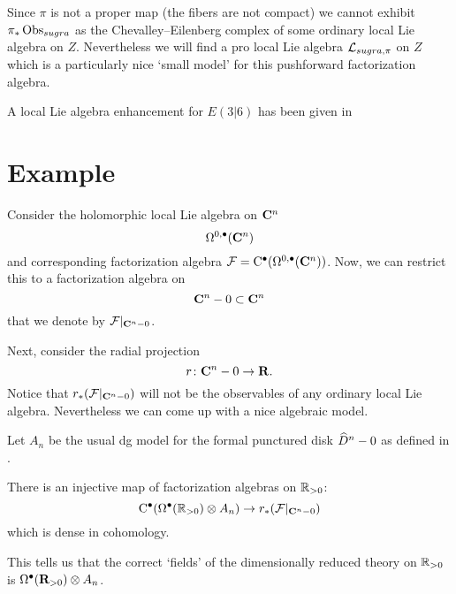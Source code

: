 \documentclass[11pt]{amsart}
\begin{document}
Since $\pi$ is not a proper map (the fibers are not compact) we cannot exhibit $\pi_*\Obs_{sugra}$ as the Chevalley--Eilenberg complex of some ordinary local Lie algebra on $Z$. 
Nevertheless we will find a pro local Lie algebra $\cL_{sugra,\pi}$ on $Z$ which is a particularly nice `small model' for this pushforward factorization algebra.

A local Lie algebra enhancement for $E(3|6)$ has been given in \cite{SWsuca6d} 







\section{Example} 

Consider the holomorphic local Lie algebra on $\C^n$
\[
\Omega^{0,\bu}(\C^n) 
\]
and corresponding factorization algebra $\cF = \clie^\bu(\Omega^{0,\bu}(\C^n))$. 
Now, we can restrict this to a factorization algebra on
\[
\C^n - 0 \subset \C^n
\]
that we denote by $\cF|_{\C^n - 0}$. 

Next, consider the radial projection
\[
r \colon \C^n - 0 \to \R .
\]
Notice that $r_* (\cF|_{\C^n - 0})$ will not be the observables of any ordinary local Lie algebra.
Nevertheless we can come up with a nice algebraic model.  

Let $A_n$ be the usual dg model for the formal punctured disk $\Hat{D}^n - 0$ as defined in \cite{FHK,GWkm}.

\begin{lem}
There is an injective map of factorization algebras on $\RR_{>0}$:
\[
\clie^\bu(\Omega^\bu(\RR_{>0}) \otimes A_n) \to r_* (\cF|_{\C^n - 0}) 
\]
which is dense in cohomology.
\end{lem}

This tells us that the correct `fields' of the dimensionally reduced theory on $\RR_{>0}$ is $\Omega^\bu(\R_{>0}) \otimes A_n$. 
\end{document}

